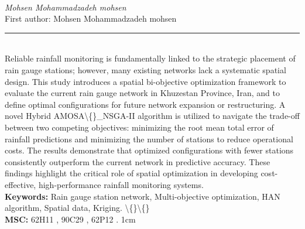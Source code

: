 \documentclass[10pt,twoside]{article}
\begin{document}
\noindent\begin{minipage}[t][\textheight]{\textwidth}
\\[0.35em]
{\itshape Mohsen Mohammadzadeh mohsen}\\[0.2em]
{\footnotesize First author: Mohsen Mohammadzadeh mohsen}\\[0.45em]
\noindent\rule{\textwidth}{0.3pt}\\[0.4em]
{\footnotesize  Reliable rainfall monitoring is fundamentally linked to the strategic placement of rain gauge stations; however, many existing networks lack a systematic spatial design. This study introduces a spatial bi-objective optimization framework to evaluate the current rain gauge network in Khuzestan Province, Iran, and to define optimal configurations for future network expansion or restructuring. A novel Hybrid AMOSA\textbackslash\{\}\_NSGA-II algorithm is utilized to navigate the trade-off between two competing objectives: minimizing the root mean total error of rainfall predictions and minimizing the number of stations to reduce operational costs. The results demonstrate that optimized configurations with fewer stations consistently outperform the current network in predictive accuracy. These findings highlight the critical role of spatial optimization in developing cost-effective, high-performance rainfall monitoring systems.}\\[0.4em]
{\footnotesize\bfseries Keywords:} {\footnotesize Rain gauge station network, Multi-objective optimization, HAN algorithm, Spatial data, Kriging. \textbackslash\{\}\textbackslash\{\}}\\[0.15em]
{\footnotesize\bfseries MSC:} {\footnotesize 62H11 , 90C29 , 62P12 . 1cm}\\
\vfill
\end{minipage}
\newpage
\end{document}
